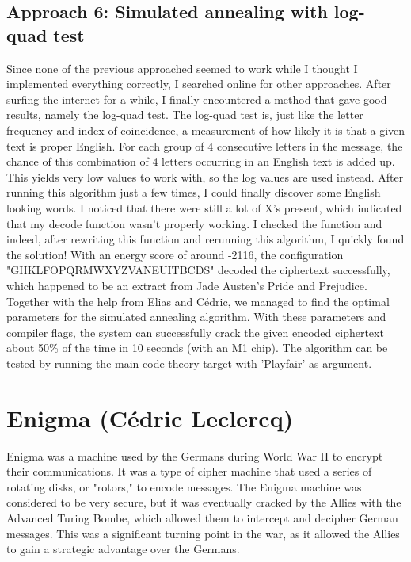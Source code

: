 \documentclass{article}
\begin{document}
\subsection{Approach 6: Simulated annealing with log-quad test}
Since none of the previous approached seemed to work while I thought I implemented everything correctly, I searched online for other approaches. After surfing the internet for a while, I finally encountered a method that gave good results, namely the log-quad test. The log-quad test is, just like the letter frequency and index of coincidence, a measurement of how likely it is that a given text is proper English. For each group of 4 consecutive letters in the message, the chance of this combination of 4 letters occurring in an English text is added up. This yields very low values to work with, so the log values are used instead. After running this algorithm just a few times, I could finally discover some English looking words. I noticed that there were still a lot of X's present, which indicated that my decode function wasn't properly working. I checked the function and indeed, after rewriting this function and rerunning this algorithm, I quickly found the solution! With an energy score of around -2116, the configuration "GHKLFOPQRMWXYZVANEUITBCDS" decoded the ciphertext successfully, which happened to be an extract from Jade Austen's Pride and Prejudice. Together with the help from Elias and Cédric, we managed to find the optimal parameters for the simulated annealing algorithm. With these parameters and compiler flags, the system can successfully crack the given encoded ciphertext about 50\% of the time in 10 seconds (with an M1 chip). The algorithm can be tested by running the main code-theory target with 'Playfair' as argument.

\newpage

\section{Enigma (Cédric Leclercq)}

Enigma was a machine used by the Germans during World War II to encrypt their communications. It was a type of cipher machine that used a series of rotating disks, or "rotors," to encode messages. The Enigma machine was considered to be very secure, but it was eventually cracked by the Allies with the Advanced Turing Bombe, which allowed them to intercept and decipher German messages. This was a significant turning point in the war, as it allowed the Allies to gain a strategic advantage over the Germans.\\
\end{document}
